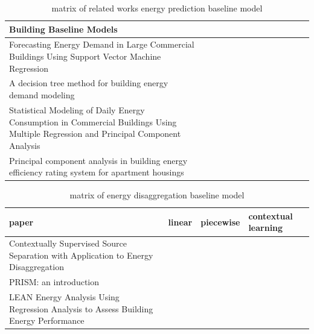 \documentclass[12pt]{article}
\newcommand{\cmark}{\ding{51}}%
\begin{document}
\begin{table}[h!]
\begin{tabular}{p{3.0cm}|p{0.7cm}|p{0.7cm}|p{0.7cm}|p{0.7cm}|p{0.7cm}|p{0.7cm}|p{0.7cm}|p{0.7cm}|p{0.7cm}|p{0.7cm}|p{0.7cm}|p{0.7cm}|p{0.7cm}}
    Building Baseline Models&&\cmark&&&&&&\cmark&\cmark&\cmark&\cmark&&\\
    \hline
    Forecasting Energy Demand in Large Commercial Buildings
    Using Support Vector Machine Regression&&&\cmark&&&&&&&&&&\\
    \hline
    A decision tree method for building energy demand modeling~\cite{Yu20101637}&&&&&&&&&&&&\cmark&\\
    \hline
    Statistical Modeling of Daily Energy Consumption in
    Commercial Buildings Using Multiple Regression and Principal
    Component Analysis~\cite{claridge1992statistical}&&&&&&&&&&&&&\cmark\\
    \hline
    Principal component analysis in building energy efficiency
    rating system for apartment housings~\cite{jung2014principal}&&&&&&&&&&&&&\cmark\\
    \hline
  \end{tabular}
  \caption{matrix of related works energy prediction baseline model}
  \label{tab:work}
\end{table}
\FloatBarrier
\begin{table}
    \tiny
  \begin{tabular}{p{6cm}|p{1cm}|p{1cm}|p{1cm}}
    \hline
    paper&linear &piecewise &contextual learning\\
    \hline
    \hline
    Contextually Supervised Source Separation with Application
    to Energy Disaggregation~\cite{wytock2013contextually}&&&\cmark\\
    \hline
    PRISM: an introduction~\cite{fels1986prism}&\cmark&&\\
    \hline
    LEAN Energy Analysis Using Regression Analysis to Assess
    Building Energy Performance~\cite{leanEng}&&\cmark&\\
    \hline
  \end{tabular}
  \caption{matrix of energy disaggregation baseline model}
  \label{tab:workDisagg}
\end{table}
\FloatBarrier
\end{document}
